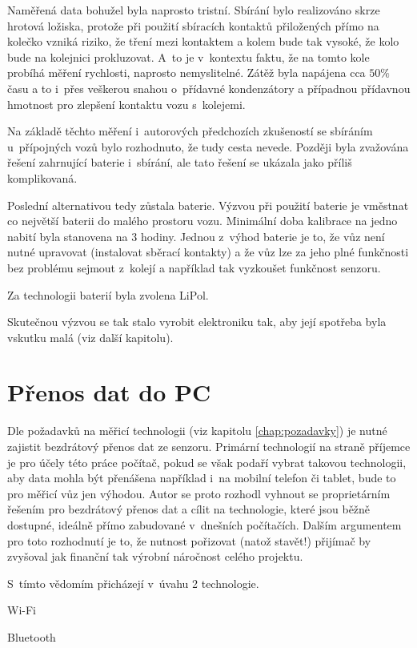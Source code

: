 Naměřená data bohužel byla naprosto tristní. Sbírání bylo realizováno skrze
hrotová ložiska, protože při použití sbíracích kontaktů přiložených přímo na
kolečko vzniká riziko, že tření mezi kontaktem a kolem bude tak vysoké, že kolo
bude na kolejnici prokluzovat. A~to je v~kontextu faktu, že na tomto kole
probíhá měření rychlosti, naprosto nemyslitelné. Zátěž byla napájena cca $50 \%$
času a to i~přes veškerou snahou o~přídavné kondenzátory a případnou přídavnou
hmotnost pro zlepšení kontaktu vozu s~kolejemi.

Na základě těchto měření i~autorových předchozích zkušeností se sbíráním
u~přípojných vozů bylo rozhodnuto, že tudy cesta nevede. Později byla zvažována
řešení zahrnující baterie i~sbírání, ale tato řešení se ukázala jako příliš
komplikovaná.

Poslední alternativou tedy zůstala baterie. Výzvou při použití baterie je
vměstnat co největší baterii do malého prostoru vozu. Minimální doba kalibrace
na jedno nabití byla stanovena na 3 hodiny. Jednou z~výhod baterie je to, že
vůz není nutné upravovat (instalovat sběrací kontakty) a že vůz lze za jeho
plné funkčnosti bez problému sejmout z~kolejí a například tak vyzkoušet
funkčnost senzoru.

Za technologii baterií byla zvolena LiPol.

Skutečnou výzvou se tak stalo vyrobit elektroniku tak, aby její spotřeba byla
vskutku malá (viz další kapitolu).

\section{Přenos dat do PC}
\label{sec:wsm-prenos-pc}

Dle požadavků na měřicí technologii (viz kapitolu \ref{chap:pozadavky}) je
nutné zajistit bezdrátový přenos dat ze senzoru. Primární technologií na straně
příjemce je pro účely této práce počítač, pokud se však podaří vybrat takovou
technologii, aby data mohla být přenášena například i~na mobilní telefon či
tablet, bude to pro měřicí vůz jen výhodou. Autor se proto rozhodl vyhnout se
proprietárním řešením pro bezdrátový přenos dat a cílit na technologie, které
jsou běžně dostupné, ideálně přímo zabudované v~dnešních počítačích. Dalším
argumentem pro toto rozhodnutí je to, že nutnost pořizovat (natož stavět!)
přijímač by zvyšoval jak finanční tak výrobní náročnost celého projektu.

S~tímto vědomím přicházejí v~úvahu 2 technologie.

\begin{compactenum}
\item Wi-Fi
\item Bluetooth
\end{compactenum}


